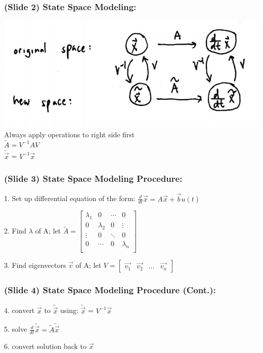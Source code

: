 \documentclass{beamer}
\begin{document}
\begin{frame}
\frametitle{(Slide 2) State Space Modeling:}

\includegraphics[scale=0.5]{images/flowchart.png} \\
Always apply operations to right side first \\
$\tilde{A} = V^{-1}AV$\\
$\tilde{\vec{x}}$ = $V^{-1}\vec{x}$\\
\end{frame}

\begin{frame}
\frametitle{(Slide 3) State Space Modeling Procedure:}

1. Set up differential equation of the form: 
$\frac{d}{dt}\vec{x} = A\vec{x} + \vec{b}u(t)$ \\ \pause

2. Find $\lambda$ of A; let 
$\tilde{A} = 
\begin{bmatrix}
\lambda_{1} & 0 & \cdots & 0 \\
0 & \lambda_{2} & 0  & \vdots \\
\vdots & 0 & \ddots & 0 \\
0 & \cdots & 0 & \lambda_{n} \\
\end{bmatrix}$\\ \pause

3. Find eigenvectors $\vec{v}$ of A; let
$V = 
\begin{bmatrix}
\vec{v_{1}} & \vec{v_{2}} & ... & \vec{v_{n}}
\end{bmatrix}$
\end{frame}

\begin{frame}
\frametitle{(Slide 4) State Space Modeling Procedure (Cont.):}

4. convert $\vec{x}$ to $\tilde{\vec{x}}$ using:
$\tilde{\vec{x}}$ = $V^{-1}\vec{x}$\\ \pause

5. solve 
$\frac{d}{dt}\tilde{\vec{x}} = \tilde{A}\tilde{\vec{x}}$\\ \pause

6. convert solution back to $\vec{x}$ 
\end{frame}
\end{document}
